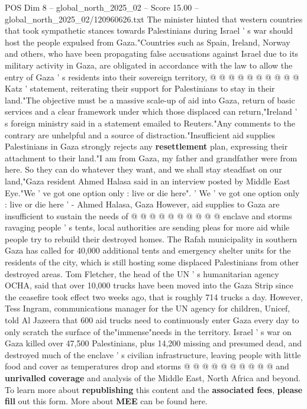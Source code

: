 \begin{textsample}{POS Dim 8 – global\_north\_2025\_02 – Score 15.00 – global\_north\_2025\_02/120960626.txt}
The minister hinted that western countries that took sympathetic stances towards Palestinians during Israel ' s war should host the people expulsed from Gaza."Countries such as Spain, Ireland, Norway and others, who have been propagating false accusations against Israel due to its military activity in Gaza, are obligated in accordance with the law to allow the entry of Gaza ' s residents into their sovereign territory, @ @ @ @ @ @ @ @ @ @ Katz ' statement, reiterating their support for Palestinians to stay in their land."The objective must be a massive scale-up of aid into Gaza, return of basic services and a clear framework under which those displaced can return,"Ireland ' s foreign ministry said in a statement emailed to Reuters."Any comments to the contrary are unhelpful and a source of distraction."Insufficient aid supplies Palestinians in Gaza strongly rejects any \textbf{resettlement} plan, expressing their attachment to their land."I am from Gaza, my father and grandfather were from here.
So they can do whatever they want, and we shall stay steadfast on our land,"Gaza resident Ahmed Halasa said in an interview posted by Middle East Eye."We ' ve got one option only : live or die here". ' We ' ve got one option only : live or die here ' - Ahmed Halasa, Gaza However, aid supplies to Gaza are insufficient to sustain the needs of @ @ @ @ @ @ @ @ @ @ enclave and storms ravaging people ' s tents, local authorities are sending pleas for more aid while people try to rebuild their destroyed homes.
The Rafah municipality in southern Gaza has called for 40,000 additional tents and emergency shelter units for the residents of the city, which is still hosting some displaced Palestinians from other destroyed areas.
Tom Fletcher, the head of the UN ' s humanitarian agency OCHA, said that over 10,000 trucks have been moved into the Gaza Strip since the ceasefire took effect two weeks ago, that is roughly 714 trucks a day.
However, Tess Ingram, communications manager for the UN agency for children, Unicef, told Al Jazeera that 600 aid trucks need to continuously enter Gaza every day to only scratch the surface of the"immense"needs in the territory.
Israel ' s war on Gaza killed over 47,500 Palestinians, plus 14,200 missing and presumed dead, and destroyed much of the enclave ' s civilian infrastructure, leaving people with little food and cover as temperatures drop and storms @ @ @ @ @ @ @ @ @ @ and \textbf{unrivalled} \textbf{coverage} and analysis of the Middle East, North Africa and beyond.
To learn more about \textbf{republishing} this content and the \textbf{associated} \textbf{fees}, \textbf{please} \textbf{fill} out this form.
More about \textbf{MEE} can be found here.

\end{textsample}
